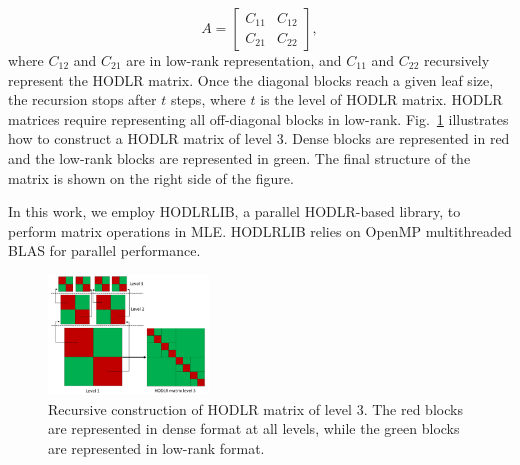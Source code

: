 \documentclass[conference]{IEEEtran}
\begin{document}
\begin{equation}\label{eq:hodlr_format}
A=
\begin{bmatrix}
C_{11} & C_{12} \\
C_{21} & C_{22}
\end{bmatrix},
\end{equation}
where $C_{12}$ and $C_{21}$ are in low-rank representation, and $C_{11}$ and $C_{22}$ recursively represent the HODLR matrix. Once
the diagonal blocks reach a given leaf size, the recursion stops 
after $t$ steps, where $t$ is the level of HODLR matrix. HODLR matrices require representing all off-diagonal blocks in low-rank. Fig.~\ref{fig:hodlr-structure} illustrates how to construct a HODLR matrix
of level 3. Dense blocks are represented in red and the low-rank 
blocks are represented in green. The final structure of the matrix is 
shown on the right side of the figure.

In this work, we employ HODLRLIB,  a parallel HODLR-based 
library, to perform matrix operations in MLE. %
HODLRLIB relies on OpenMP multithreaded BLAS for parallel performance.


\begin{figure}[h]
\centering
\includegraphics[width=0.38\textwidth]{./figures/hodlr_structure2.pdf}
\caption{Recursive construction of HODLR matrix of level 3. The red blocks are represented in dense format at all levels, while the green blocks are represented in low-rank format.}
\label{fig:hodlr-structure}
\end{figure}
\end{document}
